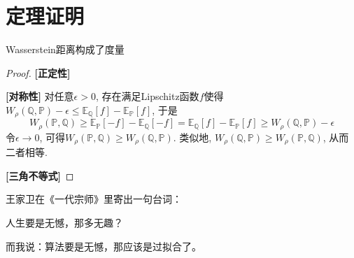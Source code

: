\section{定理证明}


Wasserstein距离构成了度量

\begin{proof}

\textbf{[正定性]}

\textbf{[对称性]}
对任意$\epsilon > 0$, 存在满足Lipschitz函数$f$使得$W_{\rho}(\mathbb{Q}, \mathbb{P}) - \epsilon \leq \mathbb{E}_{\mathbb{Q}} [f]- \mathbb{E}_{\mathbb{P}} [f]$, 于是
\begin{equation*}
	W_{\rho}(\mathbb{P}, \mathbb{Q})
	\geq \mathbb{E}_{\mathbb{P}} [-f] - \mathbb{E}_{\mathbb{Q}} [-f] 
	= \mathbb{E}_{\mathbb{Q}} [f] - \mathbb{E}_{\mathbb{P}} [f]
	\geq W_{\rho}(\mathbb{Q}, \mathbb{P}) - \epsilon
\end{equation*}
令$\epsilon \to 0$, 可得$W_{\rho}(\mathbb{P}, \mathbb{Q}) \geq W_{\rho}(\mathbb{Q}, \mathbb{P})$.
类似地, $W_{\rho}(\mathbb{Q}, \mathbb{P}) \geq W_{\rho}(\mathbb{P}, \mathbb{Q})$, 从而二者相等. 

\textbf{[三角不等式]}

\end{proof}



王家卫在《一代宗师》里寄出一句台词：

人生要是无憾，那多无趣？

而我说：算法要是无憾，那应该是过拟合了。